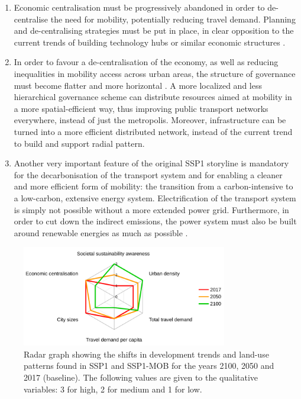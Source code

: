 \begin{enumerate}
\item Economic centralisation must be progressively abandoned in order to de-centralise the need for mobility, potentially reducing travel demand. Planning and de-centralising strategies must be put in place, in clear opposition to the current trends of building technology hubs or similar economic structures \parencite{banister2001_Transportinvestmentpromotion}.
\item In order to favour a de-centralisation of the economy, as well as reducing inequalities in mobility access across urban areas, the structure of governance must become flatter and more horizontal \parencite{oneill2017_roadsaheadNarratives}. A more localized and less hierarchical governance scheme can distribute resources aimed at mobility in a more spatial-efficient way, thus improving public transport networks everywhere, instead of just the metropolis. Moreover, infrastructure can be turned into a more efficient distributed network, instead of the current trend to build and support radial pattern.
\item Another very important feature of the original SSP1 storyline is mandatory for the decarbonisation of the transport system and for enabling a cleaner and more efficient form of mobility: the transition from a carbon-intensive to a low-carbon, extensive energy system. Electrification of the transport system is simply not possible without a more extended power grid. Furthermore, in order to cut down the indirect  emissions, the power system must also be built around renewable energies as much as possible \parencite{vuuren2017_Energylanduse}.
\end{enumerate}

\begin{figure}
\centering
\includegraphics[width=0.8\textwidth]{figures/radar_development-scenario}
\caption[Shifts in development and land-use patterns in SSP1-MOB.]{Radar graph showing the shifts in development trends and land-use patterns found in SSP1 and SSP1-MOB for the years 2100, 2050 and 2017 (baseline). The following values are given to the qualitative variables: 3 for high, 2 for medium and 1 for low.}
\label{f:results:radar_development-scenario}
\end{figure}

